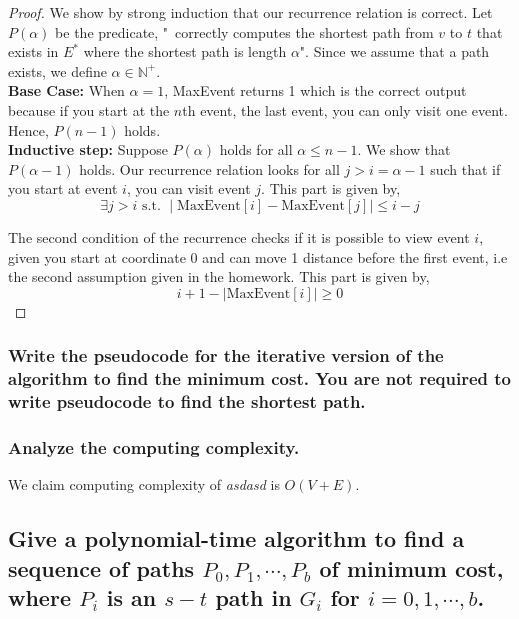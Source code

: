 \documentclass[11pt]{scrartcl}
\newcommand{\opt}{\text{OPT}}
\begin{document}
\begin{proof}
	We show by strong induction that our recurrence relation is correct. Let $P(\alpha)$ be the predicate,
		"\opt \ correctly computes the shortest path from $v$ to $t$ that exists in $E^*$ where the 
		shortest path is length $\alpha$". Since we assume that a path exists, we define $\alpha \in \mathbb{N}^+$.\\
		\textbf{Base Case:} When $\alpha = 1$, MaxEvent returns 1 which is the correct output because if you start
		at the $n$th event, the last event, you can only visit one event. Hence, $P(n-1)$ holds.\\
		\textbf{Inductive step:} Suppose $P(\alpha)$ holds for all $\alpha \leq n - 1$. We show that $P(\alpha-1)$ holds.
		Our recurrence relation looks for all $j > i = \alpha-1$ such that if you start at event $i$, you can visit event $j$.
		This part is given by, $$\exists j > i \text{ s.t. } \mid \text{MaxEvent}[i]-\text{MaxEvent}[j] \mid \leq i - j$$
		\par The second condition of the recurrence checks if it is possible to view event $i$, given you start at coordinate 0
		and can move 1 distance before the first event, i.e the second assumption given in the homework. This part is given by,
		$$ i + 1 - \mid \text{MaxEvent}[i] \mid  \geq 0$$
\end{proof}

\fi

\subsubsection{
	Write the pseudocode for the iterative version of the algorithm to find the minimum
	cost. You are not required to write pseudocode to find the shortest path.
}




\subsubsection{
	Analyze the computing complexity.
}
We claim computing complexity of \textit{asdasd} is $O(V + E)$.

\subsection{
	Give a polynomial-time algorithm to find a sequence of paths
	$P_0, P_1, \cdots , P_b$ of minimum cost, where $P_i$ is an $s-t$ path in $G_i$ for
	$i = 0, 1, \cdots, b$.
}
\end{document}
